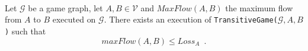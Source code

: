 \begin{lemma} \ \\
   \label{maxflowgame}
   Let $\mathcal{G}$ be a game graph, let $A, B \in \mathcal{V}$ and $MaxFlow\left(A, B\right)$ the maximum flow from
   $A$ to $B$ executed on $\mathcal{G}$. There exists an execution of
   \texttt{TransitiveGame(}$\mathcal{G}, A, B$\texttt{)} such that
   \begin{equation*}
      maxFlow\left(A, B\right) \leq Loss_A \enspace.
   \end{equation*}
\end{lemma}
